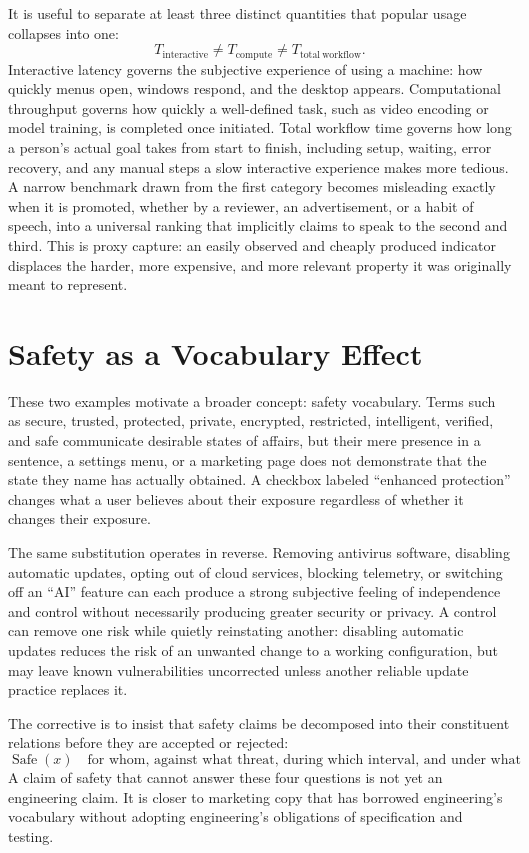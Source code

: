 \documentclass[11pt]{article}
\begin{document}
It is useful to separate at least three distinct quantities that popular usage collapses into one:
\[
T_{\mathrm{interactive}} \neq T_{\mathrm{compute}} \neq T_{\mathrm{total\ workflow}}.
\]
Interactive latency governs the subjective experience of using a machine: how quickly menus open, windows respond, and the desktop appears. Computational throughput governs how quickly a well-defined task, such as video encoding or model training, is completed once initiated. Total workflow time governs how long a person's actual goal takes from start to finish, including setup, waiting, error recovery, and any manual steps a slow interactive experience makes more tedious. A narrow benchmark drawn from the first category becomes misleading exactly when it is promoted, whether by a reviewer, an advertisement, or a habit of speech, into a universal ranking that implicitly claims to speak to the second and third. This is proxy capture: an easily observed and cheaply produced indicator displaces the harder, more expensive, and more relevant property it was originally meant to represent.

\section{Safety as a Vocabulary Effect}

These two examples motivate a broader concept: safety vocabulary. Terms such as secure, trusted, protected, private, encrypted, restricted, intelligent, verified, and safe communicate desirable states of affairs, but their mere presence in a sentence, a settings menu, or a marketing page does not demonstrate that the state they name has actually obtained. A checkbox labeled ``enhanced protection'' changes what a user believes about their exposure regardless of whether it changes their exposure.

The same substitution operates in reverse. Removing antivirus software, disabling automatic updates, opting out of cloud services, blocking telemetry, or switching off an ``AI'' feature can each produce a strong subjective feeling of independence and control without necessarily producing greater security or privacy. A control can remove one risk while quietly reinstating another: disabling automatic updates reduces the risk of an unwanted change to a working configuration, but may leave known vulnerabilities uncorrected unless another reliable update practice replaces it.

The corrective is to insist that safety claims be decomposed into their constituent relations before they are accepted or rejected:
\[
\operatorname{Safe}(x) \quad \text{for whom, against what threat, during which interval, and under what assumptions?}
\]
A claim of safety that cannot answer these four questions is not yet an engineering claim. It is closer to marketing copy that has borrowed engineering's vocabulary without adopting engineering's obligations of specification and testing.
\end{document}
